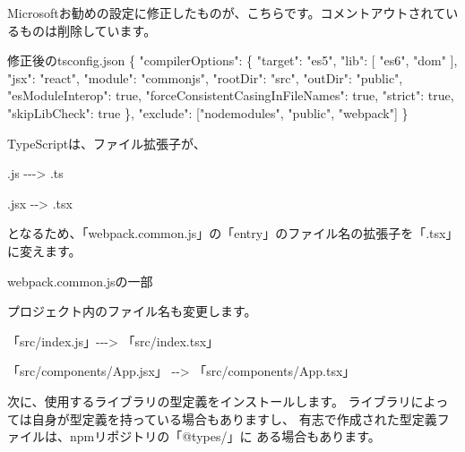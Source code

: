Microsoftお勧めの設定に修正したものが、こちらです。コメントアウトされているものは削除しています。

\def\startercodeblockfontsize{}
\begin{starterprogram}[]{修正後のtsconfig.json}  \{
    "compilerOptions": \{
      "target": "es5",
      "lib": [
        "es6",
        "dom"
      ],
      "jsx": "react",
      "module": "commonjs",
      "rootDir": "src",
      "outDir": "public",
      "esModuleInterop": true,
      "forceConsistentCasingInFileNames": true,
      "strict": true,
      "skipLibCheck": true
    \},
    "exclude": ["node\textunderscore{}modules", "public", "webpack"]
  \}
\end{starterprogram}

TypeScriptは、ファイル拡張子が、

\begin{starteritemize}
\item .js {-}{-}{-}\textgreater{} .ts
\item .jsx {-}{-}\textgreater{} .tsx
\end{starteritemize}

となるため、「webpack.common.js」の「entry」のファイル名の拡張子を「.tsx」に変えます。

\def\startercodeblockfontsize{}
\begin{starterprogram}[]{webpack.common.jsの一部}\end{starterprogram}

プロジェクト内のファイル名も変更します。

\begin{starteritemize}
\item 「src/index.js」{-}{-}{-}\textgreater{} 「src/index.tsx」
\item 「src/components/App.jsx」 {-}{-}\textgreater{} 「src/components/App.tsx」
\end{starteritemize}

次に、使用するライブラリの型定義をインストールします。
ライブラリによっては自身が型定義を持っている場合もありますし、
有志で作成された型定義ファイルは、npmリポジトリの「@types/」に
ある場合もあります。

